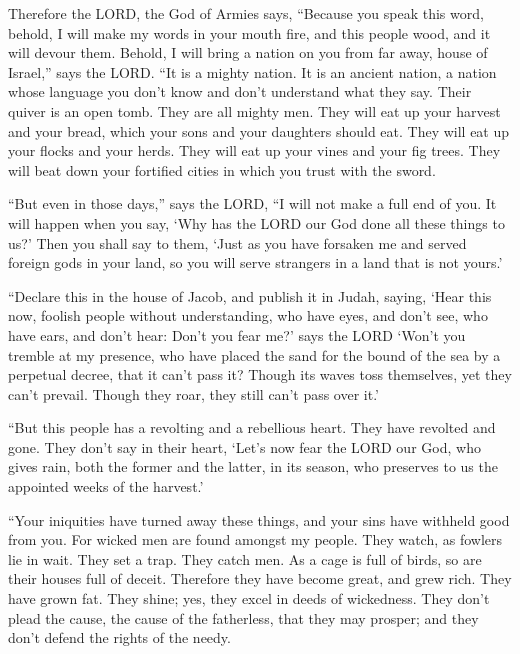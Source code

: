  Therefore the LORD, the God of Armies says, ``Because
you speak this word, behold, I will make my words in your mouth fire,
and this people wood, and it will devour them.  Behold, I
will bring a nation on you from far away, house of Israel,'' says the
LORD. ``It is a mighty nation. It is an ancient nation, a nation whose
language you don't know and don't understand what they say.
 Their quiver is an open tomb. They are all mighty men.
 They will eat up your harvest and your bread, which your
sons and your daughters should eat. They will eat up your flocks and
your herds. They will eat up your vines and your fig trees. They will
beat down your fortified cities in which you trust with the sword.

 ``But even in those days,'' says the LORD, ``I will not
make a full end of you.  It will happen when you say,
`Why has the LORD our God done all these things to us?' Then you shall
say to them, `Just as you have forsaken me and served foreign gods in
your land, so you will serve strangers in a land that is not yours.'

 ``Declare this in the house of Jacob, and publish it in
Judah, saying,  `Hear this now, foolish people without
understanding, who have eyes, and don't see, who have ears, and don't
hear:  Don't you fear me?' says the LORD `Won't you
tremble at my presence, who have placed the sand for the bound of the
sea by a perpetual decree, that it can't pass it? Though its waves toss
themselves, yet they can't prevail. Though they roar, they still can't
pass over it.'

 ``But this people has a revolting and a rebellious
heart. They have revolted and gone.  They don't say in
their heart, `Let's now fear the LORD our God, who gives rain, both the
former and the latter, in its season, who preserves to us the appointed
weeks of the harvest.'

 ``Your iniquities have turned away these things, and
your sins have withheld good from you.  For wicked men
are found amongst my people. They watch, as fowlers lie in wait. They
set a trap. They catch men.  As a cage is full of birds,
so are their houses full of deceit. Therefore they have become great,
and grew rich.  They have grown fat. They shine; yes,
they excel in deeds of wickedness. They don't plead the cause, the cause
of the fatherless, that they may prosper; and they don't defend the
rights of the needy.

